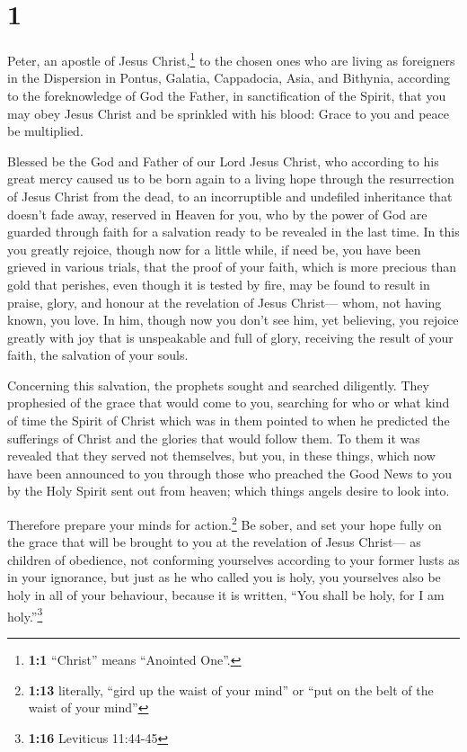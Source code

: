 \hypertarget{section}{%
\section{1}\label{section}}

 Peter, an apostle of Jesus Christ,\footnote{\textbf{1:1}
  ``Christ'' means ``Anointed One''.} to the chosen ones who are living
as foreigners in the Dispersion in Pontus, Galatia, Cappadocia, Asia,
and Bithynia,  according to the foreknowledge of God the
Father, in sanctification of the Spirit, that you may obey Jesus Christ
and be sprinkled with his blood: Grace to you and peace be multiplied.

 Blessed be the God and Father of our Lord Jesus Christ,
who according to his great mercy caused us to be born again to a living
hope through the resurrection of Jesus Christ from the dead,
 to an incorruptible and undefiled inheritance that
doesn't fade away, reserved in Heaven for you,  who by the
power of God are guarded through faith for a salvation ready to be
revealed in the last time.  In this you greatly rejoice,
though now for a little while, if need be, you have been grieved in
various trials,  that the proof of your faith, which is
more precious than gold that perishes, even though it is tested by fire,
may be found to result in praise, glory, and honour at the revelation of
Jesus Christ---  whom, not having known, you love. In him,
though now you don't see him, yet believing, you rejoice greatly with
joy that is unspeakable and full of glory,  receiving the
result of your faith, the salvation of your souls.

 Concerning this salvation, the prophets sought and
searched diligently. They prophesied of the grace that would come to
you,  searching for who or what kind of time the Spirit
of Christ which was in them pointed to when he predicted the sufferings
of Christ and the glories that would follow them.  To
them it was revealed that they served not themselves, but you, in these
things, which now have been announced to you through those who preached
the Good News to you by the Holy Spirit sent out from heaven; which
things angels desire to look into.

 Therefore prepare your minds for action.\footnote{\textbf{1:13}
  literally, ``gird up the waist of your mind'' or ``put on the belt of
  the waist of your mind''} Be sober, and set your hope fully on the
grace that will be brought to you at the revelation of Jesus Christ---
 as children of obedience, not conforming yourselves
according to your former lusts as in your ignorance,  but
just as he who called you is holy, you yourselves also be holy in all of
your behaviour,  because it is written, ``You shall be
holy, for I am holy.''\footnote{\textbf{1:16} Leviticus 11:44-45}

